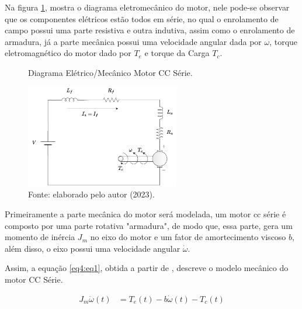 Na figura \ref{fig4:image_03}, mostra o diagrama eletromecânico do motor, nele pode-se observar que os componentes elétricos estão todos em série, no qual o enrolamento de campo possui uma parte resistiva e outra indutiva, assim como o enrolamento de armadura, já a parte mecânica possui uma velocidade angular dada por $\omega$, torque eletromagnético do motor dado por $T_e$ e torque da Carga $T_c$.


\begin{figure}[!h]
	\centering
	\caption{Diagrama Elétrico/Mecânico Motor CC Série.}
	\includegraphics[width=0.6\textwidth]{Capitulos/2_aeropendulo/4_figuras/diagrama_motor_cc.pdf}
	\caption*{Fonte: elaborado pelo autor (2023).}
	\label{fig4:image_03}
\end{figure}




Primeiramente a parte mecânica do motor será modelada, um motor cc série é composto por uma parte rotativa "armadura", de modo que, essa parte, gera um momento de inércia $J_m$ no eixo do motor e um fator de amortecimento viscoso $b$, além disso, o eixo possui uma velocidade angular $\dot{\omega}$.

Assim, a equação \ref{eq4:eq1}, obtida a partir de \cite{jesus}, descreve o modelo mecânico do motor CC Série.

\begin{align}
	J_m\ddot{\omega}(t) &= T_e(t) - b\dot{\omega}(t) - T_c(t) \label{eq4:eq1}
\end{align}


